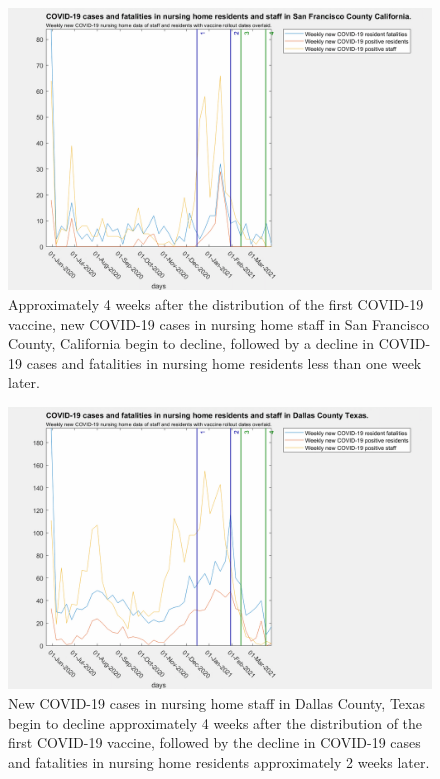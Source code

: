 \documentclass[twoside]{article}
\begin{document}
\begin{multicols}{2}
\begin{figure}[H]
	\includegraphics[width=\linewidth]{images/sanfrancisco_nursing_home_with_vaccine.png}
	\caption{Approximately 4 weeks after the distribution of the first COVID-19 vaccine, new COVID-19 cases in nursing home staff in San Francisco County, California begin to decline, followed by a decline in COVID-19 cases and fatalities in nursing home residents less than one week later.  }
	\label{fig:images/sanfrancisco_nursing_home_with_vaccineLabel}
\end{figure}

\begin{figure}[H]
	\includegraphics[width=\linewidth]{images/dallas_nursing_home_with_vaccine.png}
	\caption{New COVID-19 cases in nursing home staff in Dallas County, Texas begin to decline approximately 4 weeks after the distribution of the first COVID-19 vaccine, followed by the decline in COVID-19 cases and fatalities in nursing home residents approximately 2 weeks later.  }
	\label{fig:images/dallas_nursing_home_with_vaccineLabel}
\end{figure}


\end{multicols}
\end{document}

